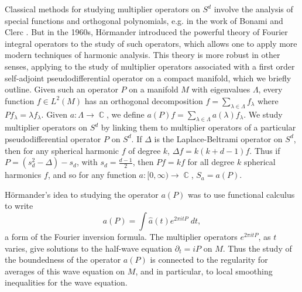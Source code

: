 \documentclass[11pt]{article}
\DeclareMathOperator{\RR}{\mathbb{R}}
\DeclareMathOperator{\CC}{\mathbb{C}}
\begin{document}
Classical methods for studying multiplier operators on $S^d$ involve the analysis of special functions and orthogonal polynomials, e.g. in the work of Bonami and Clerc \cite{BonamiClerc}. But in the 1960s, H\"{o}rmander introduced the powerful theory of Fourier integral operators to the study of such operators, which allows one to apply more modern techniques of harmonic analysis. This theory is more robust in other senses, applying to the study of multiplier operators associated with a first order self-adjoint pseudodifferential operator on a compact manifold, which we briefly outline. Given such an operator $P$ on a manifold $M$ with eigenvalues $\Lambda$, every function $f \in L^2(M)$ has an orthogonal decomposition $f = \sum_{\lambda \in \Lambda} f_\lambda$ where $Pf_\lambda = \lambda f_\lambda$. Given $a: \Lambda \to \CC$, we define $a(P) f = \sum\nolimits_{\lambda \in \Lambda} a(\lambda) f_\lambda$.  We study multiplier operators on $S^d$ by linking them to multiplier operators of a particular pseudodifferential operator $P$ on $S^d$. If $\Delta$ is the Laplace-Beltrami operator on $S^d$, then for any spherical harmonic $f$ of degree $k$, $\Delta f = k(k+d-1) f$. Thus if $P = (s_d^2 - \Delta) - s_d$, with $s_d = {\scriptstyle \frac{d-1}{2}}$, then $Pf = kf$ for all degree $k$ spherical harmonics $f$, and so for any function $a: [0,\infty) \to \CC$, $S_a = a(P)$.

H\"{o}rmander's idea to studying the operator $a(P)$ was to use functional calculus to write
%
\[ a(P) = \int \widehat{a}(t) e^{2 \pi i t P}\; dt, \]
%
a form of the Fourier inversion formula. The multiplier operators $e^{2 \pi i t P}$, as $t$ varies, give solutions to the half-wave equation $\partial_t = i P$ on $M$. Thus the study of the boundedness of the operator $a(P)$ is connected to the regularity for averages of this wave equation on $M$, and in particular, to local smoothing inequalities for the wave equation. %
\end{document}
